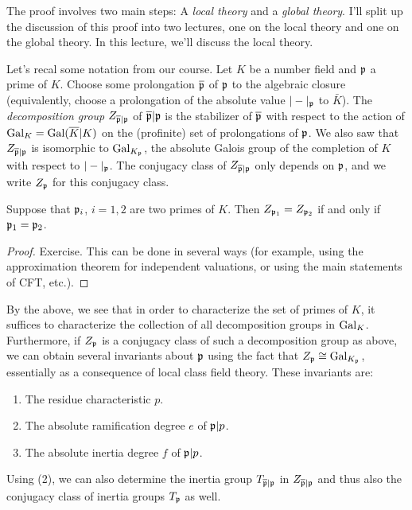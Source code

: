 The proof involves two main steps: A \emph{local theory} and a \emph{global theory}.
I'll split up the discussion of this proof into two lectures, one on the local theory and one on the global theory.
In this lecture, we'll discuss the local theory.

Let's recal some notation from our course.
Let $K$ be a number field and $\mathfrak{p}$ a prime of $K$.
Choose some prolongation $\overline {\mathfrak{p}}$ of $\mathfrak{p}$ to the algebraic closure (equivalently, choose a prolongation of the absolute value $|-|_{\mathfrak{p}}$ to $\bar K$).
The \emph{decomposition group} $Z_{\overline{\mathfrak{p}}|\mathfrak{p}}$ of $\overline{\mathfrak{p}}|\mathfrak{p}$ is the stabilizer of $\overline {\mathfrak{p}}$ with respect to the action of $\operatorname{Gal}_{K} = \operatorname{Gal}(\overline K|K)$ on the (profinite) set of prolongations of $\mathfrak{p}$.
We also saw that $Z_{\overline{\mathfrak{p}}|\mathfrak{p}}$ is isomorphic to $\operatorname{Gal}_{K_{\mathfrak{p}}}$, the absolute Galois group of the completion of $K$ with respect to $|-|_{\mathfrak{p}}$.
The conjugacy class of $Z_{\overline{\mathfrak{p}}|\mathfrak{p}}$ only depends on $\mathfrak{p}$, and we write $Z_{\mathfrak{p}}$ for this conjugacy class.

\begin{lemma}
  Suppose that $\mathfrak{p}_{i}$, $i = 1,2$ are two primes of $K$.
  Then $Z_{\mathfrak{p}_{1}} = Z_{\mathfrak{p}_{2}}$ if and only if $\mathfrak{p}_{1} = \mathfrak{p}_{2}$.
\end{lemma}
\begin{proof}
  Exercise.
  This can be done in several ways (for example, using the approximation theorem for independent valuations, or using the main statements of CFT, etc.).
\end{proof}

By the above, we see that in order to characterize the set of primes of $K$, it suffices to characterize the collection of all decomposition groups in $\operatorname{Gal}_{K}$.
Furthermore, if $Z_{\mathfrak{p}}$ is a conjugacy class of such a decomposition group as above, we can obtain several invariants about $\mathfrak{p}$ using the fact that $Z_{\mathfrak{p}} \cong \operatorname{Gal}_{K_{\mathfrak{p}}}$, essentially as a consequence of local class field theory.
These invariants are:
\begin{enumerate}
  \item The residue characteristic $p$.
  \item The absolute ramification degree $e$ of $\mathfrak{p}|p$.
  \item The absolute inertia degree $f$ of $\mathfrak{p}|p$.
\end{enumerate}
Using (2), we can also determine the inertia group $T_{\overline{\mathfrak{p}}|\mathfrak{p}}$ in $Z_{\overline{\mathfrak{p}}|\mathfrak{p}}$ and thus also the conjugacy class of inertia groups $T_{\mathfrak{p}}$ as well.

